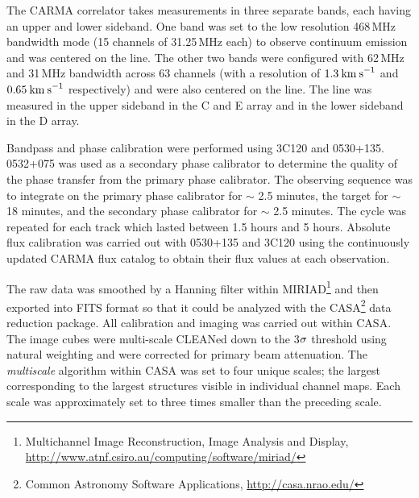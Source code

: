 \documentclass[iop]{emulateapj}
\begin{document}
The CARMA correlator takes measurements in three separate bands, each having an upper and lower sideband. One band was set to the low resolution 468\,MHz bandwidth mode (15 channels of 31.25\,MHz each) to observe continuum emission and was centered on the line. The other two bands were configured with 62\,MHz and 31\,MHz bandwidth across 63 channels (with a resolution of $1.3\>{\rm km\>s}^{-1}$ and $0.65\>{\rm km\>s}^{-1}$ respectively) and were also centered on the line. The line was measured in the upper sideband in the C and E array and in the lower sideband in the D array.

Bandpass and phase calibration were performed using 3C120 and 0530+135. 0532+075 was used as a secondary phase calibrator to determine the quality of the phase transfer from the primary phase calibrator. The observing sequence was to integrate on the primary phase calibrator for $\sim$ 2.5 minutes, the target for $\sim$ 18 minutes, and the secondary phase calibrator for $\sim$ 2.5 minutes. The cycle was repeated for each track which lasted between 1.5 hours and 5 hours. Absolute flux calibration was carried out with 0530+135 and 3C120 using the continuously updated CARMA flux catalog to obtain their flux values at each observation.

The raw data was smoothed by a Hanning filter within MIRIAD\footnote{Multichannel Image Reconstruction, Image Analysis and Display, \url{http://www.atnf.csiro.au/computing/software/miriad/}} and then exported into FITS format so that it could be analyzed with the CASA\footnote{Common Astronomy Software Applications, \url{http://casa.nrao.edu/}} data reduction package. All calibration and imaging was carried out within CASA. The image cubes  were multi-scale  CLEANed down to the 3$\rm{\sigma}$ threshold using natural weighting and were corrected for primary beam attenuation. The \textit{multiscale} algorithm \citep{2008AJ....136.2897R} within CASA was set to four unique scales; the largest corresponding to the largest structures visible in individual channel maps. Each scale was approximately set to three times smaller than the preceding scale. 
\end{document}
